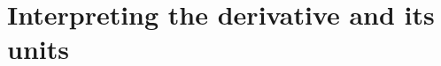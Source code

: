 \section{Interpreting the derivative and its units} \label{S:1.5.Units}



\newpage



\newpage



\newpage



\newpage

